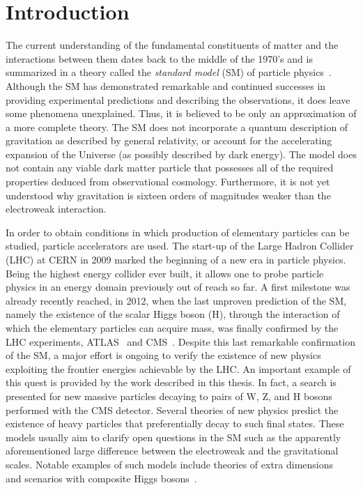\chapter{Introduction}
\label{ch:Introduction}

The current understanding of the fundamental constituents of matter and the interactions between them
dates back to the middle of the 1970's and is summarized in a theory called the \textit{standard model} (SM) of particle physics~\cite{QFTbook}. 
Although the SM has demonstrated remarkable and continued successes in providing experimental predictions and describing the observations, 
it does leave some phenomena unexplained. Thus, it is believed to be only an approximation of a more complete theory.
The SM does not incorporate a quantum description of gravitation as described by general relativity,
or account for the accelerating expansion of the Universe (as possibly described by dark energy).
The model does not contain any viable dark matter particle that possesses all of the required properties deduced from observational cosmology.
Furthermore, it is not yet understood why gravitation is sixteen orders of magnitudes weaker than the electroweak interaction. 

In order to obtain conditions in which production of elementary particles can be studied, particle accelerators are used.
The start-up of the Large Hadron Collider (LHC) at CERN in 2009 marked the beginning of a new era in particle physics.
Being the highest energy collider ever built, it allows one to probe particle physics in an energy domain previously out of reach so far.
A first milestone was already recently reached, in 2012, when the last unproven prediction of the SM, namely the existence of the scalar Higgs boson (H), through the interaction of which the elementary particles can acquire mass,
was finally confirmed by the LHC experiments, ATLAS~\cite{Aad:2012tfa} and CMS~\cite{Chatrchyan:2013lba}.
Despite this last remarkable confirmation of the SM, a major effort is ongoing to verify the existence of new physics exploiting the frontier energies achievable by the LHC.
An important example of this quest is provided by the work described in this thesis. In fact, a search is presented for new massive particles decaying to pairs of W, Z, and H bosons performed with the CMS detector.
Several theories of new physics predict the existence of heavy particles that preferentially decay to such final states.
These models usually aim to clarify open questions in the SM such as the apparently aforementioned large difference between the electroweak and the gravitational scales.
Notable examples of such models include theories of extra dimensions~\cite{Randall:1999ee,Agashe:2007zd} and scenarios with composite Higgs bosons~\cite{Composite0,Composite1}.

